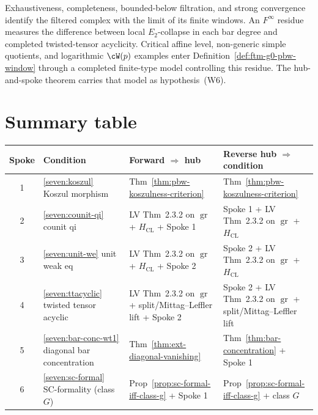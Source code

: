 \begin{remark}
\label{rem:ftm-sevenfold-failure-mode}
Exhaustiveness, completeness, bounded-below filtration, and strong
convergence identify the filtered complex with the limit of its
finite windows.  An $F^\infty$ residue measures the difference between
local $E_2$-collapse in each bar degree and completed twisted-tensor
acyclicity.  Critical affine level, non-generic simple quotients, and
logarithmic $\cW(p)$ examples enter
Definition~\ref{def:ftm-g0-pbw-window} through a completed finite-type
model controlling this residue.  The hub-and-spoke theorem carries
that model as hypothesis~\textup{(W6)}.
\end{remark}

\section{Summary table}
\label{sec:ftm-summary}

\begin{center}
\renewcommand{\arraystretch}{1.25}
\small
\begin{tabular}{@{}c p{} p{}
 p{}@{}}
\toprule
Spoke & Condition & Forward $\Rightarrow$ hub & Reverse hub
$\Rightarrow$ condition \\
\midrule
1 & \ref{seven:koszul} Koszul morphism
& Thm~\ref{thm:pbw-koszulness-criterion}
& Thm~\ref{thm:pbw-koszulness-criterion} \\
2 & \ref{seven:counit-qi} counit qi
& LV Thm~2.3.2 on $\operatorname{gr}$ + $H_{\mathrm{CL}}$ + Spoke 1
& Spoke 1 + LV Thm~2.3.2 on $\operatorname{gr}$ + $H_{\mathrm{CL}}$ \\
3 & \ref{seven:unit-we} unit weak eq
& LV Thm~2.3.2 on $\operatorname{gr}$ + $H_{\mathrm{CL}}$ + Spoke 2
& Spoke 2 + LV Thm~2.3.2 on $\operatorname{gr}$ + $H_{\mathrm{CL}}$ \\
4 & \ref{seven:ttacyclic} twisted tensor acyclic
& LV Thm~2.3.2 on $\operatorname{gr}$ + split/Mittag--Leffler lift + Spoke 2
& Spoke 2 + LV Thm~2.3.2 on $\operatorname{gr}$ + split/Mittag--Leffler lift \\
5 & \ref{seven:bar-conc-wt1} diagonal bar concentration
& Thm~\ref{thm:ext-diagonal-vanishing}
& Thm~\ref{thm:bar-concentration} + Spoke 1 \\
6 & \ref{seven:sc-formal} SC-formality (class $G$)
& Prop~\ref{prop:sc-formal-iff-class-g} + Spoke 1
& Prop~\ref{prop:sc-formal-iff-class-g} + class $G$ \\
\bottomrule
\end{tabular}
\end{center}

